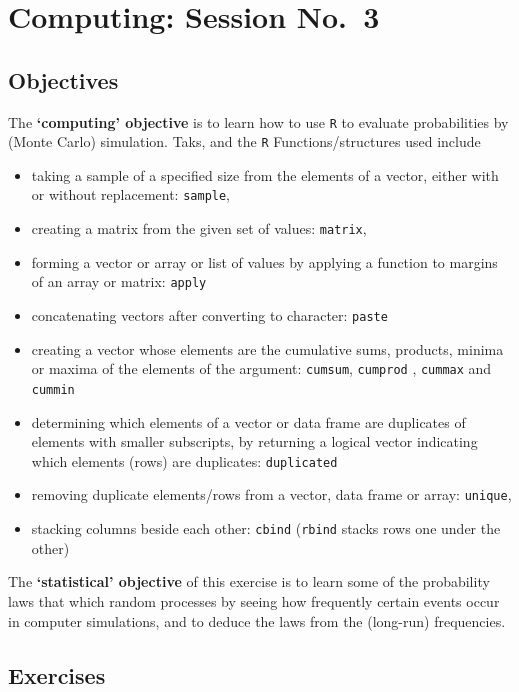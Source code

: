 \documentclass[]{book}
\begin{document}
\hypertarget{computing03}{%
\chapter{Computing: Session No.~3}\label{computing03}}

\hypertarget{objectives-5}{%
\section{Objectives}\label{objectives-5}}

The \textbf{`computing' objective} is to learn how to use \texttt{R} to evaluate probabilities by (Monte Carlo) simulation. Taks, and the \texttt{R} Functions/structures used include

\begin{itemize}
\item
  taking a sample of a specified size from the elements of a vector, either with or without replacement: \texttt{sample},
\item
  creating a matrix from the given set of values: \texttt{matrix},
\item
  forming a vector or array or list of values by applying a function to margins of an array or matrix: \texttt{apply}
\item
  concatenating vectors after converting to character: \texttt{paste}
\item
  creating a vector whose elements are the cumulative sums, products, minima or maxima of the elements of the argument: \texttt{cumsum}, \texttt{cumprod} ,
  \texttt{cummax} and \texttt{cummin}
\item
  determining which elements of a vector or data frame are duplicates of elements with smaller subscripts, by returning a logical vector indicating which elements (rows) are duplicates: \texttt{duplicated}
\item
  removing duplicate elements/rows from a vector, data frame or array: \texttt{unique},
\item
  stacking columns beside each other: \texttt{cbind} (\texttt{rbind} stacks rows one under the other)
\end{itemize}

The \textbf{`statistical' objective} of this exercise is to learn some of the probability laws that which random processes by seeing how frequently certain events occur in computer simulations, and to deduce the laws from the (long-run) frequencies.

\hypertarget{exercises-7}{%
\section{Exercises}\label{exercises-7}}
\end{document}
